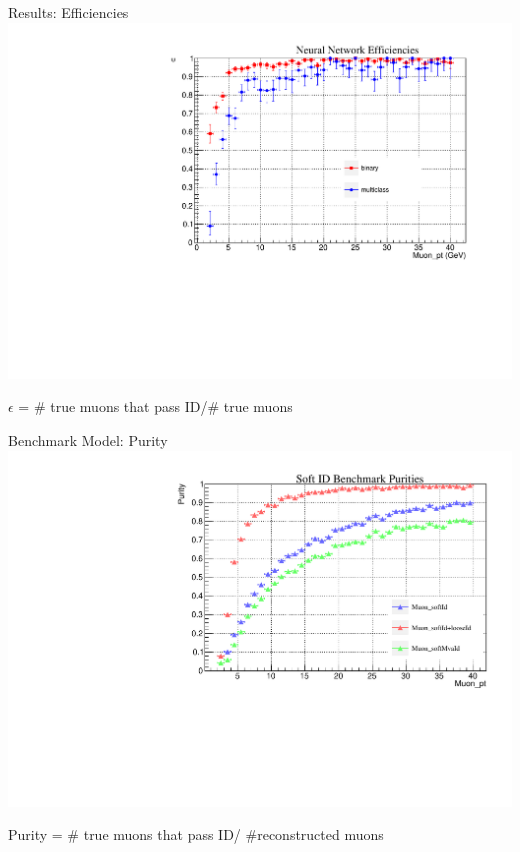 \documentclass[10pt,handout]{beamer}
\begin{document}
\begin{frame}{Results: Efficiencies}
\centering
\includegraphics[scale=0.5]{NN_efficiencies.pdf}

$\epsilon$ = \# true muons that pass ID/\# true muons
\end{frame}


\begin{frame}{Benchmark Model: Purity}
\centering
\includegraphics[scale=.5]{benchmarkPurity_TTjets.pdf}

Purity = \# true muons that pass ID/ \#reconstructed muons
\end{frame}
\end{document}
